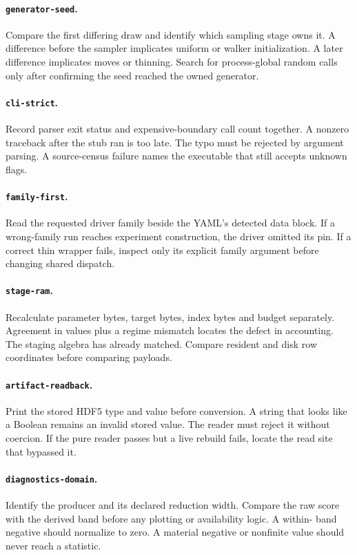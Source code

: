 \documentclass[10pt,aps,prd,twocolumn,nofootinbib]{revtex4-2}
\newcommand{\code}[1]{\texttt{#1}}
\begin{document}
\paragraph{\code{generator-seed}.}
Compare the first differing draw and identify which sampling stage owns it.
A difference before the sampler implicates uniform or walker initialization.
A later difference implicates moves or thinning.  Search for process-global
random calls only after confirming the seed reached the owned generator.

\paragraph{\code{cli-strict}.}
Record parser exit status and expensive-boundary call count together.  A
nonzero traceback after the stub ran is too late.  The typo must be rejected by
argument parsing.  A source-census failure names the executable that still
accepts unknown flags.

\paragraph{\code{family-first}.}
Read the requested driver family beside the YAML's detected data block.  If a
wrong-family run reaches experiment construction, the driver omitted its pin.
If a correct thin wrapper fails, inspect only its explicit family argument
before changing shared dispatch.

\paragraph{\code{stage-ram}.}
Recalculate parameter bytes, target bytes, index bytes and budget separately.
Agreement in values plus a regime mismatch locates the defect in accounting.
The staging algebra has already matched.  Compare resident and disk row
coordinates before comparing payloads.

\paragraph{\code{artifact-readback}.}
Print the stored HDF5 type and value before conversion.  A string that looks
like a Boolean remains an invalid stored value.  The reader must reject it
without coercion.  If the pure reader passes
but a live rebuild fails, locate the read site that bypassed it.

\paragraph{\code{diagnostics-domain}.}
Identify the producer and its declared reduction width.  Compare the raw score
with the derived band before any plotting or availability logic.  A within-
band negative should normalize to zero.  A material negative or nonfinite
value should never reach a statistic.
\end{document}
